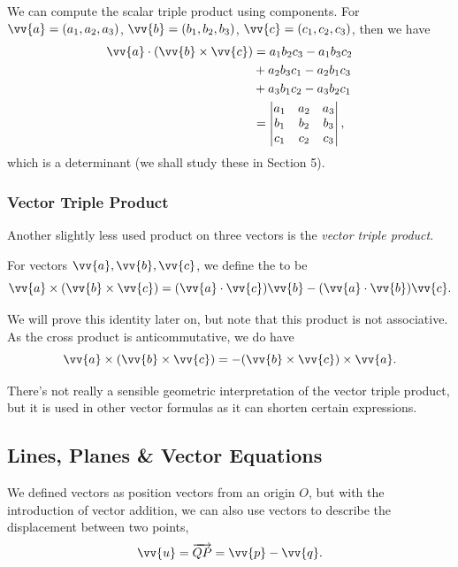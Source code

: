 We can compute the scalar triple product using components. For $\vv{a} = (a_1, a_2, a_3)$, $\vv{b} = (b_1, b_2, b_3)$, $\vv{c} = (c_1, c_2, c_3)$, then we have
\begin{align*}
    \vv{a} \cdot (\vv{b} \times \vv{c}) &= a_1 b_2 c_3 - a_1 b_3 c_2 \\
    & + a_2 b_3 c_1 - a_2 b_1 c_3 \\
    & + a_3 b_1 c_2 - a_3 b_2 c_1 \\
    &= \begin{vmatrix}
        a_1 & a_2 & a_3 \\
        b_1 & b_2 & b_3 \\
        c_1 & c_2 & c_3 
    \end{vmatrix},
\end{align*}
which is a determinant (we shall study these in Section 5).

\subsubsection{Vector Triple Product}

Another slightly less used product on three vectors is the \emph{vector triple product}.

\begin{definition}
    For vectors $\vv{a}, \vv{b}, \vv{c}$, we define the  to be
    $$
    \vv{a} \times(\vv{b} \times \vv{c})=(\vv{a} \cdot \vv{c}) \vv{b}-(\vv{a} \cdot \vv{b}) \vv{c}.
    $$
\end{definition}

We will prove this identity later on, but note that this product is not associative. As the cross product is anticommutative, we do have
$$
\vv{a} \times(\vv{b} \times \vv{c}) = - (\vv{b} \times \vv{c}) \times \vv{a}.
$$

There's not really a sensible geometric interpretation of the vector triple product, but it is used in other vector formulas as it can shorten certain expressions.

\subsection{Lines, Planes \& Vector Equations}

We defined vectors as position vectors from an origin $O$, but with the introduction of vector addition, we can also use vectors to describe the displacement between two points,
$$
\vv{u} = \overrightarrow{QP} = \vv{p} - \vv{q}.
$$

